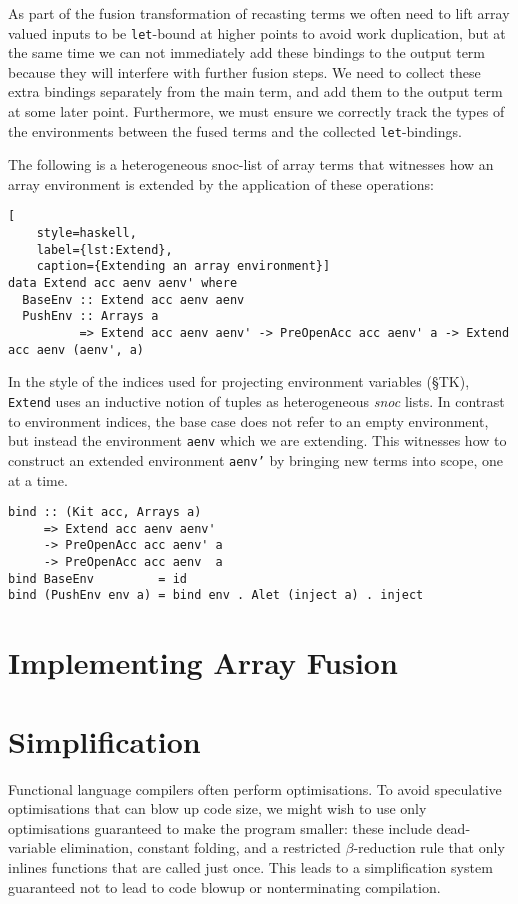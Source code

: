 As part of the fusion transformation of recasting terms we often need to lift
array valued inputs to be \texttt{let}-bound at higher points to avoid work
duplication, but at the same time we can not immediately add these bindings to
the output term because they will interfere with further fusion steps. We need
to collect these extra bindings separately from the main term, and add them
to the output term at some later point. Furthermore, we must ensure we correctly
track the types of the environments between the fused terms and the collected
\texttt{let}-bindings.

The following is a heterogeneous snoc-list of array terms that witnesses how an
array environment is extended by the application of these operations:
%
\begin{lstlisting}[
    style=haskell,
    label={lst:Extend},
    caption={Extending an array environment}]
data Extend acc aenv aenv' where
  BaseEnv :: Extend acc aenv aenv
  PushEnv :: Arrays a
          => Extend acc aenv aenv' -> PreOpenAcc acc aenv' a -> Extend acc aenv (aenv', a)
\end{lstlisting}
%
In the style of the  indices used for projecting environment
variables (\S TK), \texttt{Extend} uses an inductive notion of tuples as
heterogeneous \emph{snoc} lists. In contrast to environment indices, the base
case does not refer to an empty environment, but instead the environment
\texttt{aenv} which we are extending. This witnesses how to construct an
extended environment \texttt{aenv'} by bringing new terms into scope, one at a
time.
%
\begin{lstlisting}[style=haskell]
bind :: (Kit acc, Arrays a)
     => Extend acc aenv aenv'
     -> PreOpenAcc acc aenv' a
     -> PreOpenAcc acc aenv  a
bind BaseEnv         = id
bind (PushEnv env a) = bind env . Alet (inject a) . inject
\end{lstlisting}


\section{Implementing Array Fusion}

\section{Simplification}
\label{sec:simplification}

Functional language compilers often perform optimisations. To avoid speculative
optimisations that can blow up code size, we might wish to use only
optimisations guaranteed to make the program smaller: these include
dead-variable elimination, constant folding, and a restricted $\beta$-reduction
rule that only inlines functions that are called just once. This leads to a
simplification system guaranteed not to lead to code blowup or nonterminating
compilation.

